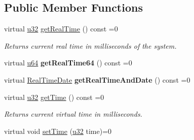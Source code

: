 \subsection*{Public Member Functions}
\begin{DoxyCompactItemize}
\item 
virtual \hyperlink{namespaceirr_a0416a53257075833e7002efd0a18e804}{u32} \hyperlink{classirr_1_1ITimer_aeb263c77d73b29e436694d6d58bdbd32}{get\+Real\+Time} () const  =0
\begin{DoxyCompactList}\small\item\em Returns current real time in milliseconds of the system. \end{DoxyCompactList}\item 
virtual \hyperlink{namespaceirr_a9701cac11d289143453e212684075af7}{u64} {\bfseries get\+Real\+Time64} () const  =0\hypertarget{classirr_1_1ITimer_a28348054f0a41b8db8facf44d4bac54e}{}\label{classirr_1_1ITimer_a28348054f0a41b8db8facf44d4bac54e}

\item 
virtual \hyperlink{structirr_1_1ITimer_1_1RealTimeDate}{Real\+Time\+Date} {\bfseries get\+Real\+Time\+And\+Date} () const  =0\hypertarget{classirr_1_1ITimer_ae611417544e5e3fccc11d076b1c2ec45}{}\label{classirr_1_1ITimer_ae611417544e5e3fccc11d076b1c2ec45}

\item 
virtual \hyperlink{namespaceirr_a0416a53257075833e7002efd0a18e804}{u32} \hyperlink{classirr_1_1ITimer_a4e0ba6dccdfc6419b1335e68a2ec36b3}{get\+Time} () const  =0
\begin{DoxyCompactList}\small\item\em Returns current virtual time in milliseconds. \end{DoxyCompactList}\item 
virtual void \hyperlink{classirr_1_1ITimer_ae93bf312ccf87478565e080450291386}{set\+Time} (\hyperlink{namespaceirr_a0416a53257075833e7002efd0a18e804}{u32} time)=0\hypertarget{classirr_1_1ITimer_ae93bf312ccf87478565e080450291386}{}\label{classirr_1_1ITimer_ae93bf312ccf87478565e080450291386}


\end{DoxyCompactItemize}
